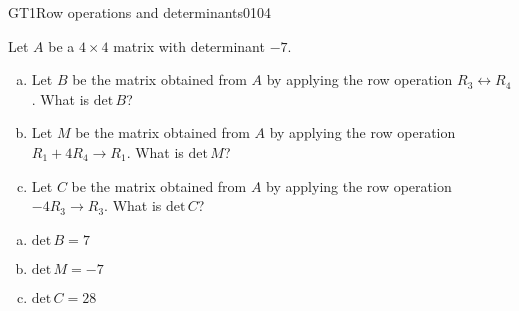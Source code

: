 \begin{exercise}{GT1}{Row operations and determinants}{0104} 
\begin{exerciseStatement} 

Let \(A\) be a \(4 \times 4\) matrix with determinant \(-7\).

 

\begin{enumerate}[(a)]
\item Let \(B\) be the matrix obtained from \(A\) by applying the row operation \(R_3 \leftrightarrow R_4\). What is \(\mathrm{det}\,B\)?
\item Let \(M\) be the matrix obtained from \(A\) by applying the row operation \(R_1 + 4 R_4 \to R_1\). What is \(\mathrm{det}\,M\)?
\item Let \(C\) be the matrix obtained from \(A\) by applying the row operation \(-4 R_3 \to R_3\). What is \(\mathrm{det}\,C\)?
\end{enumerate}

     \end{exerciseStatement}
 \begin{exerciseAnswer} 

\begin{enumerate}[(a)]
\item \(\mathrm{det}\,B=7\)
\item \(\mathrm{det}\,M=-7\)
\item \(\mathrm{det}\,C=28\)
\end{enumerate}

     \end{exerciseAnswer}
 \end{exercise}


\newpage




